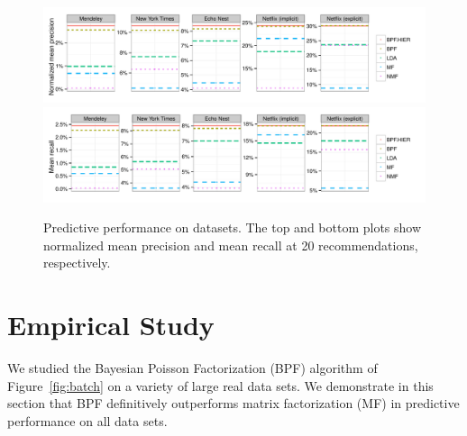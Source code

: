 
\begin{figure}[t!]
\centering
\includegraphics[width=\textwidth]{figures/mean_precision_at_20.pdf}\\
\includegraphics[width=\textwidth]{figures/mean_recall_at_20.pdf}\\
\caption{Predictive performance on datasets. The top and bottom plots
  show normalized mean precision and mean recall at 20
  recommendations, respectively.}
\label{fig:precision_recall_at_10}
\end{figure}


\section{Empirical Study}
We studied the Bayesian Poisson Factorization (BPF) algorithm of
Figure~\ref{fig:batch} on a variety of large real data sets. We
demonstrate in this section that BPF definitively outperforms matrix
factorization (MF) in predictive performance on all data sets.


